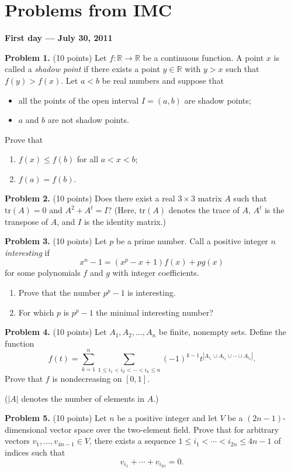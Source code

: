\documentclass{article}
\begin{document}
\pagestyle{plain}

\section*{Problems from IMC}

\textbf{First day — July 30, 2011}

\textbf{Problem 1.} (10 points)
Let \( f : \mathbb{R} \to \mathbb{R} \) be a continuous function.
A point \( x \) is called a \textit{shadow point} if there exists a point \( y \in \mathbb{R} \)
with \( y > x \) such that \( f(y) > f(x) \). Let \( a < b \) be real numbers and suppose that
\begin{itemize}
    \item all the points of the open interval \( I = (a, b) \) are shadow points;
    \item \( a \) and \( b \) are not shadow points.
\end{itemize}
Prove that
\begin{enumerate}
    \item \( f(x) \leq f(b) \) for all \( a < x < b \);
    \item \( f(a) = f(b) \).
\end{enumerate}

\textbf{Problem 2.} (10 points)
Does there exist a real \( 3 \times 3 \) matrix \( A \) such that \( \text{tr}(A) = 0 \) and \( A^2 + A^t = I \)?
(Here, \(\text{tr}(A)\) denotes the trace of \( A \), \( A^t \) is the transpose of \( A \), and \( I \) is the identity matrix.)

\textbf{Problem 3.} (10 points)
Let \( p \) be a prime number. Call a positive integer \( n \) \textit{interesting} if
\[
x^n - 1 = (x^p - x + 1) f(x) + p g(x)
\]
for some polynomials \( f \) and \( g \) with integer coefficients.
\begin{enumerate}
    \item Prove that the number \( p^p - 1 \) is interesting.
    \item For which \( p \) is \( p^p - 1 \) the minimal interesting number?
\end{enumerate}

\textbf{Problem 4.} (10 points)
Let \( A_1, A_2, \ldots, A_n \) be finite, nonempty sets. Define the function
\[
f(t) = \sum_{k=1}^{n} \sum_{1 \leq i_1 < i_2 < \cdots < i_k \leq n} (-1)^{k-1} t^{|A_{i_1} \cup A_{i_2} \cup \cdots \cup A_{i_k}|}.
\]
Prove that \( f \) is nondecreasing on \([0, 1]\).

(\(|A|\) denotes the number of elements in \(A\).)

\textbf{Problem 5.} (10 points)
Let \( n \) be a positive integer and let \( V \) be a \( (2n-1) \)-dimensional vector space over the two-element field. Prove that for arbitrary vectors \( v_1, \ldots, v_{4n-1} \in V \), there exists a sequence \( 1 \leq i_1 < \cdots < i_{2n} \leq 4n-1 \) of indices such that
\[
v_{i_1} + \cdots + v_{i_{2n}} = 0.
\]
\end{document}
